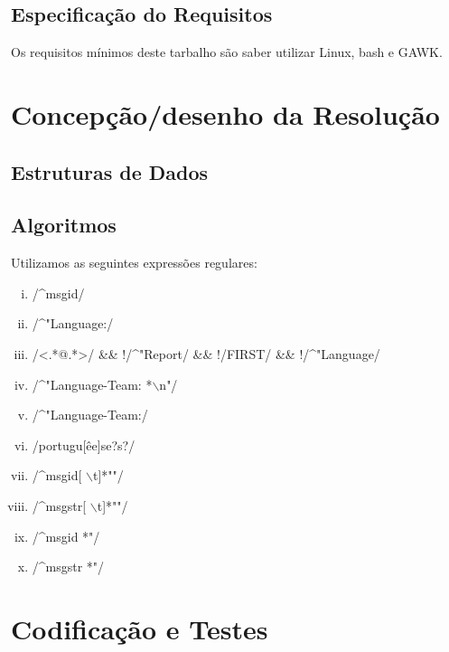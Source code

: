 \documentclass{report}
\begin{document}
\section{Especificação do Requisitos}
Os requisitos mínimos deste tarbalho são saber utilizar Linux, bash e GAWK.

\chapter{Concepção/desenho da Resolução}
\section{Estruturas de Dados}
\section{Algoritmos}
Utilizamos as seguintes expressões regulares:
\begin{enumerate}[i)]
\item /\^{}msgid/
\item /\^{}"Language:/
\item /\textless.*@.*\textgreater/ \&\& !/\^{}"Report/ \&\& !/FIRST/ \&\& !/\^{}"Language/
\item /\^{}"Language-Team: *$\backslash$n"/
\item /\^{}"Language-Team:/
\item /portugu[êe]se?s?/
\item /\^{}msgid[ $\backslash$t]*""/
\item /\^{}msgstr[ $\backslash$t]*""/
\item /\^{}msgid *"/
\item /\^{}msgstr *"/
\end{enumerate}




\chapter{Codificação e Testes}
\end{document}
